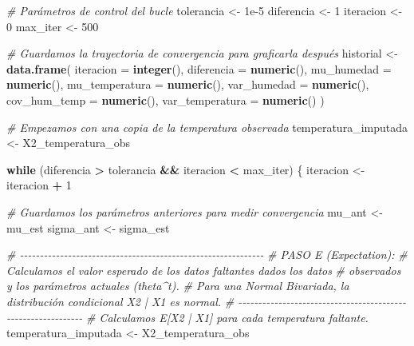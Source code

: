 \documentclass[
]{article}
\newenvironment{Shaded}{\begin{snugshade}}{\end{snugshade}}
\newcommand{\AttributeTok}[1]{\textcolor[rgb]{0.13,0.29,0.53}{#1}}
\newcommand{\CommentTok}[1]{\textcolor[rgb]{0.56,0.35,0.01}{\textit{#1}}}
\newcommand{\ControlFlowTok}[1]{\textcolor[rgb]{0.13,0.29,0.53}{\textbf{#1}}}
\newcommand{\DecValTok}[1]{\textcolor[rgb]{0.00,0.00,0.81}{#1}}
\newcommand{\FloatTok}[1]{\textcolor[rgb]{0.00,0.00,0.81}{#1}}
\newcommand{\FunctionTok}[1]{\textcolor[rgb]{0.13,0.29,0.53}{\textbf{#1}}}
\newcommand{\NormalTok}[1]{#1}
\newcommand{\OtherTok}[1]{\textcolor[rgb]{0.56,0.35,0.01}{#1}}
\newcommand{\SpecialCharTok}[1]{\textcolor[rgb]{0.81,0.36,0.00}{\textbf{#1}}}
\begin{document}
\begin{Shaded}
\begin{Highlighting}[]
\CommentTok{\# Parámetros de control del bucle}
\NormalTok{tolerancia }\OtherTok{\textless{}{-}} \FloatTok{1e{-}5}
\NormalTok{diferencia }\OtherTok{\textless{}{-}} \DecValTok{1}
\NormalTok{iteracion }\OtherTok{\textless{}{-}} \DecValTok{0}
\NormalTok{max\_iter }\OtherTok{\textless{}{-}} \DecValTok{500}

\CommentTok{\# Guardamos la trayectoria de convergencia para graficarla después}
\NormalTok{historial }\OtherTok{\textless{}{-}} \FunctionTok{data.frame}\NormalTok{(}
  \AttributeTok{iteracion =} \FunctionTok{integer}\NormalTok{(),}
  \AttributeTok{diferencia =} \FunctionTok{numeric}\NormalTok{(),}
  \AttributeTok{mu\_humedad =} \FunctionTok{numeric}\NormalTok{(),}
  \AttributeTok{mu\_temperatura =} \FunctionTok{numeric}\NormalTok{(),}
  \AttributeTok{var\_humedad =} \FunctionTok{numeric}\NormalTok{(),}
  \AttributeTok{cov\_hum\_temp =} \FunctionTok{numeric}\NormalTok{(),}
  \AttributeTok{var\_temperatura =} \FunctionTok{numeric}\NormalTok{()}
\NormalTok{)}

\CommentTok{\# Empezamos con una copia de la temperatura observada}
\NormalTok{temperatura\_imputada }\OtherTok{\textless{}{-}}\NormalTok{ X2\_temperatura\_obs}

\ControlFlowTok{while}\NormalTok{ (diferencia }\SpecialCharTok{\textgreater{}}\NormalTok{ tolerancia }\SpecialCharTok{\&\&}\NormalTok{ iteracion }\SpecialCharTok{\textless{}}\NormalTok{ max\_iter) \{}
\NormalTok{  iteracion }\OtherTok{\textless{}{-}}\NormalTok{ iteracion }\SpecialCharTok{+} \DecValTok{1}
  
  \CommentTok{\# Guardamos los parámetros anteriores para medir convergencia}
\NormalTok{  mu\_ant }\OtherTok{\textless{}{-}}\NormalTok{ mu\_est}
\NormalTok{  sigma\_ant }\OtherTok{\textless{}{-}}\NormalTok{ sigma\_est}
  
  \CommentTok{\# {-}{-}{-}{-}{-}{-}{-}{-}{-}{-}{-}{-}{-}{-}{-}{-}{-}{-}{-}{-}{-}{-}{-}{-}{-}{-}{-}{-}{-}{-}{-}{-}{-}{-}{-}{-}{-}{-}{-}{-}{-}{-}{-}{-}{-}{-}{-}{-}{-}{-}{-}{-}{-}{-}{-}{-}{-}{-}{-}{-}{-}}
  \CommentTok{\# PASO E (Expectation):}
  \CommentTok{\# Calculamos el valor esperado de los datos faltantes dados los datos }
  \CommentTok{\# observados y los parámetros actuales (theta\^{}t).}
  \CommentTok{\# Para una Normal Bivariada, la distribución condicional X2 | X1 es normal.}
  \CommentTok{\# {-}{-}{-}{-}{-}{-}{-}{-}{-}{-}{-}{-}{-}{-}{-}{-}{-}{-}{-}{-}{-}{-}{-}{-}{-}{-}{-}{-}{-}{-}{-}{-}{-}{-}{-}{-}{-}{-}{-}{-}{-}{-}{-}{-}{-}{-}{-}{-}{-}{-}{-}{-}{-}{-}{-}{-}{-}{-}{-}{-}{-}}
  \CommentTok{\# Calculamos E[X2 | X1] para cada temperatura faltante.}
\NormalTok{  temperatura\_imputada }\OtherTok{\textless{}{-}}\NormalTok{ X2\_temperatura\_obs}
  

\end{Highlighting}
\end{Shaded}
\end{document}
